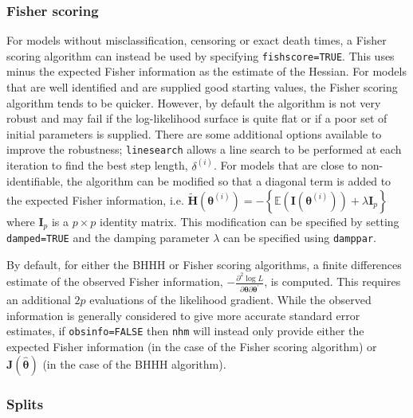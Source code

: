 \documentclass{article}
\numberwithin{equation}{section}
\begin{document}
\subsubsection*{Fisher scoring}

For models without misclassification, censoring or exact death times, a Fisher scoring algorithm can instead be used by specifying \verb!fishscore=TRUE!.  This uses minus the expected Fisher information as the estimate of the Hessian. For models that are well identified and are supplied good starting values, the Fisher scoring algorithm tends to be quicker. However, by default the algorithm is not very robust and may fail if the log-likelihood surface is quite flat or if a poor set of initial parameters is supplied. There are some additional options available to improve the robustness; \verb!linesearch! allows a line search to be performed at each iteration to find the best step length, $\delta^{(i)}$. For models that are close to non-identifiable, the algorithm can be modified so that a diagonal term is added to the expected Fisher information, i.e. $\mathbf{\tilde{H}}(\bm\theta^{(i)}) = - \left\{\mathbb{E}(\mathbf{I}(\bm\theta^{(i)})) + \lambda \mathbf{I}_p\right\}$ where $\mathbf{I}_p$ is a $p \times p$ identity matrix. This modification can be specified by setting \verb!damped=TRUE! and the damping parameter $\lambda$ can be specified using \verb!damppar!.

By default, for either the BHHH or Fisher scoring algorithms, a finite differences estimate of the observed Fisher information, $-\frac{\partial^2 \log L}{\partial \bm\theta\partial \bm\theta^{'}}$, is computed. This requires an additional $2p$ evaluations of the likelihood gradient. While the observed information is generally considered to give more accurate standard error estimates, if \verb!obsinfo=FALSE! then \verb!nhm! will instead only provide either the expected Fisher information (in the case of the Fisher scoring algorithm) or $\mathbf{J}(\hat{\bm\theta})$ (in the case of the BHHH algorithm).

\subsubsection{Splits}
\label{sec:splits}
\end{document}
